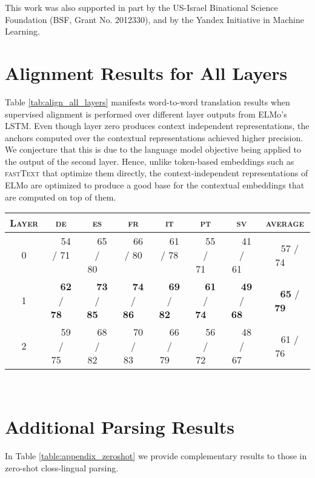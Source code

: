 \documentclass[11pt,a4paper]{article}
\newcommand{\tabref}[1]{Table \ref{#1}}
\begin{document}
This work was also supported in part by the US-Israel Binational Science Foundation (BSF, Grant No. 2012330), and by the Yandex Initiative in Machine Learning.  




\appendix
\section{Alignment Results for All Layers}\label{appendix:align}

\tabref{tab:align_all_layers} manifests word-to-word translation results when supervised alignment is performed over different layer outputs from ELMo's LSTM. Even though layer zero produces context independent representations, the anchors computed over the contextual representations achieved higher precision. We conjecture that this is due to the language model objective being applied to the output of the second layer. Hence, unlike token-based embeddings such as \textsc{fastText} that optimize them directly, the context-independent representations of ELMo are optimized to produce a good base for the contextual embeddings that are computed on top of them.

\begin{table*}[t!]
\centering
\begin{tabular}{c|cccccc|c}
\toprule
\textsc{Layer}       & \textsc{de}    & \textsc{es}    & \textsc{fr}    & \textsc{it}    & \textsc{pt}    & \textsc{sv}    & \textsc{average} \\ \midrule
0                    & \ \ 54 / 71 \ \  & \ \ 65 / 80\ \  & \ \ 66 / 80 \ \  & \ \ 61 / 78 \ \  & \ \ 55 / 71\ \  & \ \ 41 / 61\ \  &  \ \ 57 / 74\ \    \\ 
1                    & \ \ \textbf{62} / \textbf{78}\ \  & \ \ \textbf{73} / \textbf{85}\ \  & \ \ \textbf{74} / \textbf{86}\ \  & \ \ \textbf{69} / \textbf{82}\ \  & \ \ \textbf{61} / \textbf{74}\ \  & \ \ \textbf{49} / \textbf{68}\ \  &  \ \ \textbf{65} / \textbf{79}\ \    \\ 
2                    & \ \ 59 / 75\ \  & \ \ 68 / 82\ \  & \ \ 70 / 83\ \  & \ \ 66 / 79\ \  & \ \ 56 / 72\ \  & \ \ 48 / 67\ \  &  \ \ 61 / 76\ \    \\ 
\bottomrule
\end{tabular}\\
\caption{Per ELMo layer word translation to English precision @1 / @5 using CSLS~\cite{conneau2017word} with a dictionary (supervised) for German (\textsc{de}), Spanish (\textsc{es}), French (\textsc{fr}), Italian (\textsc{it}), Portuguese (\textsc{pt}) and Swedish (\textsc{sv}). Layer 0 representations are the result of the character-level word embeddings (which are context independent). Layer 1 and 2 alignments are based on anchors from the first and second LSTM layer output respectively.}\label{tab:align_all_layers}
\end{table*} \section{Additional Parsing Results}\label{appendix:parsing}
In Table \ref{table:appendix_zeroshot} we provide complementary results to those in zero-shot closs-lingual parsing.
\end{document}
